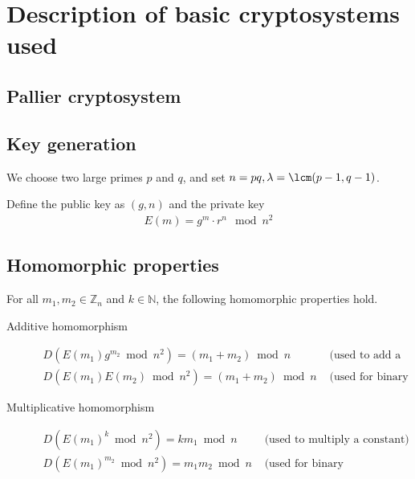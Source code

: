 


\section{Description of basic cryptosystems used}
\subsection{Pallier cryptosystem}
\subsection{Key generation}
We choose two large primes $p$ and $q$, and set $n = pq, \lambda = \mathrm\lcm(p-1,q-1)$.

Define the public key as $(g,n)$ and the private key
\begin{align*}
  E(m) = g^m \cdot r^n \mod{n^2}
\end{align*}
\subsection{Homomorphic properties}
For all $m_1,m_2 \in \mathbb{Z}_n$ and $k\in \mathbb{N}$, the following homomorphic properties hold.
\begin{description}
  \item[Additive homomorphism]
  \begin{align*}
    D(E(m_1)g^{m_2}\bmod n^2)=(m_1+m_2)\bmod n & \text{ (used to add a constant)}\\
    D(E(m_1)E(m_2)\bmod n^2)=(m_1+m_2)\bmod n & \text{ (used for binary addition)}
  \end{align*}
  \item[Multiplicative homomorphism]
  \begin{align*}
    D(E(m_1)^k\bmod n^2)= km_1\bmod n & \text{ (used to multiply a constant)}\\
    D(E(m_1)^{m_2}\bmod n^2)= m_1m_2\bmod n & \text{ (used for binary multiplication)}
  \end{align*}
\end{description}
